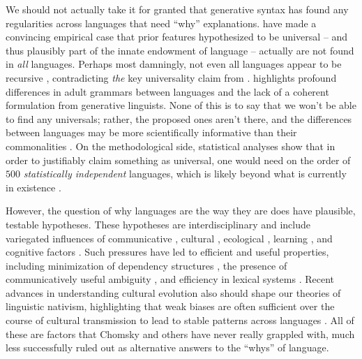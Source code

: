 \documentclass[output=paper,colorlinks,citecolor=brown
]{langscibook}
\begin{document}
We should not actually take it for granted that generative syntax has found any regularities across languages that need ``why'' explanations. \citet{evans2009myth} have made a convincing empirical case that prior features hypothesized to be universal -- and thus plausibly part of the innate endowment of language -- actually are not found in \textit{all} languages. Perhaps most damningly, not even all languages appear to be recursive \citep{everett2005cultural,futrell2016corpus,pullum2023dan}, contradicting \textit{the} key universality claim from . \citet{dkabrowska2015exactly} highlights profound differences in adult grammars between languages and the lack of a coherent formulation from generative linguists.  None of this is to say that we won't be able to find any universals; rather, the proposed ones aren't there, and the differences between languages may be more scientifically informative than their commonalities \citep{pullum2009universals}. On the methodological side, statistical analyses show that in order to justifiably claim something as universal, one would need on the order of $500$ \textit{statistically independent} languages, which is likely beyond what is currently in existence \citep{piantadosi2014quantitative}. 

However, the question of why languages are the way they are does have plausible, testable hypotheses. These hypotheses are interdisciplinary \citep{reali2009necessity} and include variegated influences of communicative \citep{zipf1965psycho,hockett1959animal,bates1982functionalist,piantadosi2012communicative,gibson2013rational,gibson2019efficiency,coupe2019different,hahn2020universals,futrell2022information}, cultural \citep{everett2005cultural,lupyan2010language,dale2012understanding,everett2015climate}, ecological \citep{lupyan2016there}, learning \citep{smith2012compositionality,steinert2019learnability,steinert2020ease}, and cognitive factors \citep{gibson2000dependency,futrell2015large}. Such pressures have led to efficient and useful properties, including minimization of dependency structures \citep{futrell2015large}, the presence of communicatively useful ambiguity \citep{piantadosi2012communicative}, and efficiency in lexical systems \citep{kemp2012kinship,kemp2018semantic,zaslavsky2019semantic,steinert2020quantifiers,mollica2021forms,mahowald2022efficient,denic2022indefinite}. Recent advances in understanding cultural evolution also should shape our theories of linguistic nativism, highlighting that weak biases are often sufficient over the course of cultural transmission to lead to stable patterns across languages \citep{thompson2016culture,kirby2014iterated,chater2009restrictions}. All of these are factors that Chomsky and others have never really grappled with, much less successfully ruled out as alternative answers to the ``whys'' of language.  
\end{document}
